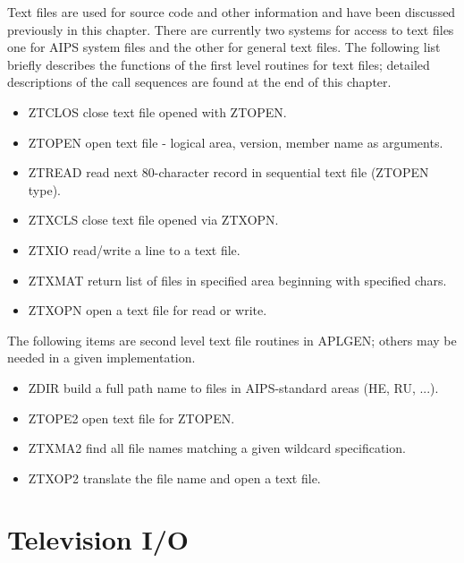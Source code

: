 Text files are used for source code and other information and have
been discussed previously in this chapter.  There are currently two
systems for access to text files one for AIPS system files and the
other for general text files.  The following list briefly describes
the functions of the first level routines for text files; detailed
descriptions of the call sequences are found at the end of this
chapter.
\begin{itemize} %
\item ZTCLOS  close text file opened with ZTOPEN.
\item ZTOPEN  open text file - logical area, version,
member name as arguments.
\item ZTREAD  read next 80-character record in
sequential text file (ZTOPEN type).
\item ZTXCLS  close text file opened via ZTXOPN.
\item ZTXIO   read/write a line to a text file.
\item ZTXMAT  return list of files in specified area
beginning with specified chars.
\item ZTXOPN  open a text file for read or write.
\end{itemize} %

The following items are second level text file routines in APLGEN;
others may be needed in a given implementation.


\begin{itemize} %
\item ZDIR    build a full path name to files in
AIPS-standard areas (HE, RU, ...).
\item ZTOPE2  open text file for ZTOPEN.
\item ZTXMA2  find all file names matching a given
wildcard specification.
\item ZTXOP2  translate the file name and open a text
file.
\end{itemize} %

\section{Television I/O}

